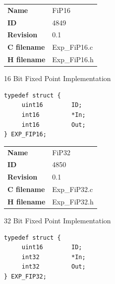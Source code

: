 \ifdefined \AddTestReports
{}
\fi
{}
\nopagebreak[0]
\begin{tabular}{l l}
\textbf{Name} & FiP16 \tabularnewline
\textbf{ID} & 4849 \tabularnewline
\textbf{Revision} & 0.1 \tabularnewline
\textbf{C filename} & Exp\_FiP16.c \tabularnewline
\textbf{H filename} & Exp\_FiP16.h \tabularnewline
\end{tabular}
\vspace{1ex}

16 Bit Fixed Point Implementation

\begin{lstlisting}
typedef struct {
     uint16        ID;
     int16         *In;
     int16         Out;
} EXP_FIP16;
\end{lstlisting}

\ifdefined \AddTestReports
{}
\fi
{}
\nopagebreak[0]
\begin{tabular}{l l}
\textbf{Name} & FiP32 \tabularnewline
\textbf{ID} & 4850 \tabularnewline
\textbf{Revision} & 0.1 \tabularnewline
\textbf{C filename} & Exp\_FiP32.c \tabularnewline
\textbf{H filename} & Exp\_FiP32.h \tabularnewline
\end{tabular}
\vspace{1ex}

32 Bit Fixed Point Implementation

\begin{lstlisting}
typedef struct {
     uint16        ID;
     int32         *In;
     int32         Out;
} EXP_FIP32;
\end{lstlisting}

\ifdefined \AddTestReports
{}
\fi
